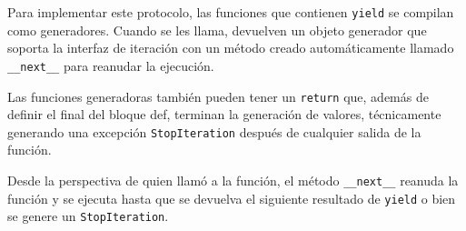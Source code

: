 Para implementar este protocolo, las funciones que contienen
\texttt{yield} se compilan como generadores. Cuando se les llama,
devuelven un objeto generador que soporta la interfaz de iteración con
un método creado automáticamente llamado \texttt{\_\_next\_\_} para
reanudar la ejecución.

Las funciones generadoras también pueden tener un \texttt{return} que,
además de definir el final del bloque def, terminan la generación de
valores, técnicamente generando una excepción \texttt{StopIteration}
después de cualquier salida de la función.

Desde la perspectiva de quien llamó a la función, el método
\texttt{\_\_next\_\_} reanuda la función y se ejecuta hasta que se
devuelva el siguiente resultado de \texttt{yield} o bien se genere un
\texttt{StopIteration}.\\

